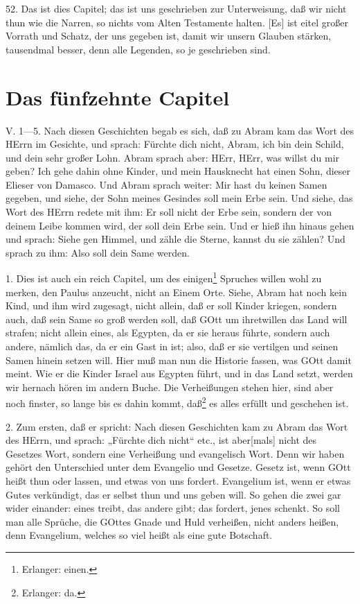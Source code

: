 52. Das ist dies Capitel; das ist uns geschrieben zur Unterweisung, daß wir nicht thun wie die Narren, so nichts vom Alten Testamente halten. [Es] ist eitel großer Vorrath und Schatz, der uns gegeben ist, damit wir unsern Glauben stärken, tausendmal besser, denn alle Legenden, so je geschrieben sind.

\section{Das fünfzehnte Capitel}

\begin{schriftzitat}
V. 1—5. Nach diesen Geschichten begab es sich, daß zu Abram kam das Wort des HErrn im Gesichte, und sprach: Fürchte dich nicht, Abram, ich bin dein Schild, und dein sehr großer Lohn. Abram sprach aber: HErr, HErr, was willst du mir geben? Ich gehe dahin ohne Kinder, und mein Hausknecht hat einen Sohn, dieser Elieser von Damasco. Und Abram sprach weiter: Mir hast du keinen Samen gegeben, und siehe, der Sohn meines Gesindes soll mein Erbe sein. Und siehe, das Wort des HErrn redete mit ihm: Er soll nicht der Erbe sein, sondern der von deinem Leibe kommen wird, der soll dein Erbe sein. Und er hieß ihn hinaus gehen und sprach: Siehe gen Himmel, und zähle die Sterne, kannst du sie zählen? Und sprach zu ihm: Also soll dein Same werden.
\end{schriftzitat}

1. Dies ist auch ein reich Capitel, um des einigen\footnote{Erlanger: einen.} Spruches willen wohl zu merken, den Paulus anzeucht, nicht an Einem Orte. Siehe, Abram hat noch kein Kind, und ihm wird zugesagt, nicht allein, daß er soll Kinder kriegen, sondern auch, daß sein Same so groß werden soll, daß GOtt um ihretwillen das Land will
strafen; nicht allein eines, als Egypten, da er sie heraus führte, sondern auch andere, nämlich das, da er ein Gast in ist; also, daß er sie vertilgen und seinen Samen hinein setzen will. Hier muß man nun die Historie fassen, was GOtt damit meint. Wie er die Kinder Israel aus Egypten führt, und in das Land setzt, werden wir hernach hören im andern Buche. Die Verheißungen stehen hier, sind aber noch finster, so lange bis es dahin kommt, daß\footnote{Erlanger: da.} es alles erfüllt und geschehen ist.

2. Zum ersten, daß er spricht: Nach diesen Geschichten kam zu Abram das Wort des HErrn, und sprach: „Fürchte dich nicht“ etc., ist aber[mals] nicht des Gesetzes Wort, sondern eine Verheißung und evangelisch Wort. Denn wir haben gehört den Unterschied unter dem Evangelio und Gesetze. Gesetz ist, wenn GOtt heißt thun oder lassen, und etwas von uns fordert. Evangelium ist, wenn er etwas Gutes verkündigt, das er selbst thun und uns geben will. So gehen die zwei gar wider einander: eines treibt, das andere gibt; das fordert, jenes schenkt. So soll man alle Sprüche, die GOttes Gnade und Huld verheißen, nicht anders heißen, denn Evangelium, welches so viel heißt als eine gute Botschaft.

